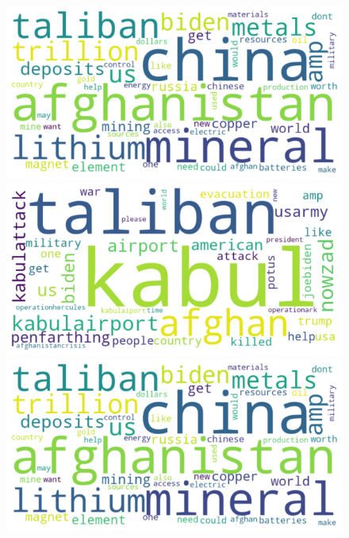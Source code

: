 \documentclass[12pt,%
               a4paper,%
               oneside,openany,%
               titlepage,%
               headinclude,footinclude,%
               BCOR5mm,%
               cleardoublepage=empty,%
               tablecaptionabove,%
               floatperchapter,
               ]{scrreprt}                 %
\begin{document}
\begin{figure}[ht]
\begin{minipage}[b]{0.5\linewidth}
 \centering
 \includegraphics[width=.9\linewidth]{Figures/WordCloud_Rareearth.png}
 \vspace{4ex}
\end{minipage}
  \begin{minipage}[b]{0.5\linewidth}
    \centering
    \includegraphics[width=.9\linewidth]{Figures/WordCloud_Afghanistan.png}
    \vspace{4ex}
  \end{minipage}%
   \begin{minipage}[b]{0.5\linewidth}
    \centering
    \includegraphics[width=.9\linewidth]{Figures/WordCloud_Rareearth.png}

\end{minipage}
\end{figure}
\end{document}
